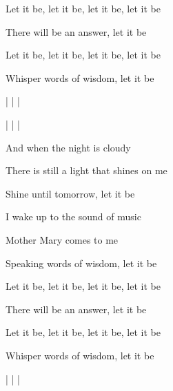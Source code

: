\begin{song}
\bigskip

Let it be, let it be, let it be, let it be \par
{}There will be an answer, let it be    \par
Let it be, let it be, let it be, let it be \par
{}Whisper words of wisdom, let it be    \par

\bigskip

   |    |
  |  \par
{}   |    |
  |  \par

\bigskip

And when the night is cloudy \par
There is still a light that shines on me \par
{}Shine until tomorrow, let it be    \par

\bigskip

I wake up to the sound of music \par
{}Mother Mary comes to me \par
{}Speaking words of wisdom, let it be    \par

\bigskip

Let it be, let it be, let it be, let it be \par
{}There will be an answer, let it be    \par
Let it be, let it be, let it be, let it be \par
{}Whisper words of wisdom, let it be    \par

\bigskip

   |    |
  |  \par






\end{song}
